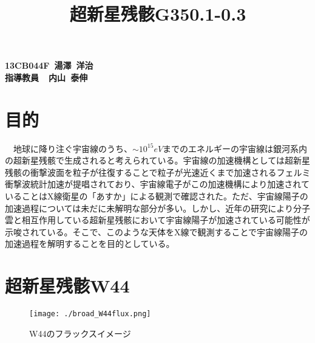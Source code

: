 \documentclass[10pt]{article}
\title{{\large {\bf 超新星残骸G350.1-0.3}}}
\author{}
\date{}
\begin{document}
\maketitle
%
\thispagestyle{empty}
%
\vspace{-15mm}
\begin{flushright}
{\bf 13CB044F~湯澤~洋治}
\\
{\bf 指導教員~~内山~泰伸}

\end{flushright}


\section{{\normalsize 目的}}
　地球に降り注ぐ宇宙線のうち、$\sim10^{15}eV$までのエネルギーの宇宙線は銀河系内の超新星残骸で生成されると考えられている。宇宙線の加速機構としては超新星残骸の衝撃波面を粒子が往復することで粒子が光速近くまで加速されるフェルミ衝撃波統計加速が提唱されており、宇宙線電子がこの加速機構により加速されていることはX線衛星の「あすか」による観測で確認された。ただ、宇宙線陽子の加速過程については未だに未解明な部分が多い。しかし、近年の研究により分子雲と相互作用している超新星残骸において宇宙線陽子が加速されている可能性が示唆されている。そこで、このような天体をX線で観測することで宇宙線陽子の加速過程を解明することを目的としている。
\section{{\normalsize 超新星残骸W44}}
 \begin{wrapfigure}[17]{r}[0mm]{55mm}
\begin{center}
\texttt{[image: ./broad\_W44flux.png]}
\caption{W44のフラックスイメージ}
\label{fig:W44}
 \end{center}
\end{wrapfigure}
\end{document}
